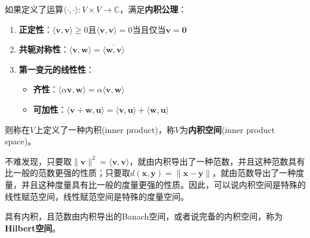 \begin{definition}[内积]
    如果定义了运算$\langle \cdot,\cdot\rangle:V\times V\rightarrow \mathbb{C}$，满足\textbf{内积公理}：
    \begin{enumerate}
        \item \textbf{正定性}：$\langle \mathbf{v}, \mathbf{v} \rangle \geq 0$且$\langle \mathbf{v}, \mathbf{v} \rangle = 0$当且仅当$\mathbf{v} = \mathbf{0}$
        \item \textbf{共轭对称性}：$\langle \mathbf{v}, \mathbf{w} \rangle = \overline{\langle \mathbf{w}, \mathbf{v} \rangle}$
        \item \textbf{第一变元的线性性}：
              \begin{itemize}
                  \item \textbf{齐性}：$\langle \alpha \mathbf{v}, \mathbf{w} \rangle = \alpha \langle \mathbf{v}, \mathbf{w} \rangle$
                  \item \textbf{可加性}：$\langle \mathbf{v} + \mathbf{w}, \mathbf{u} \rangle = \langle \mathbf{v}, \mathbf{u} \rangle + \langle \mathbf{w}, \mathbf{u} \rangle$
              \end{itemize}
    \end{enumerate}
    则称在$V$上定义了一种内积(inner product)，称$V$为\textbf{内积空间}(inner product space)。
\end{definition}

不难发现，只要取$\|\mathbf{v}\|^2=\langle \mathbf{v}, \mathbf{v} \rangle$，就由内积导出了一种范数，并且这种范数具有比一般的范数更强的性质；只要取$d(\mathbf{x},\mathbf{y})=\|\mathbf{x}-\mathbf{y}\|$，就由范数导出了一种度量，并且这种度量具有比一般的度量更强的性质。因此，可以说内积空间是特殊的线性赋范空间，线性赋范空间是特殊的度量空间。

\begin{definition}[Hilbert空间]\label{def:hilbert_space}
    具有内积，且范数由内积导出的Banach空间，或者说完备的内积空间，称为\textbf{Hilbert空间}。
\end{definition}

